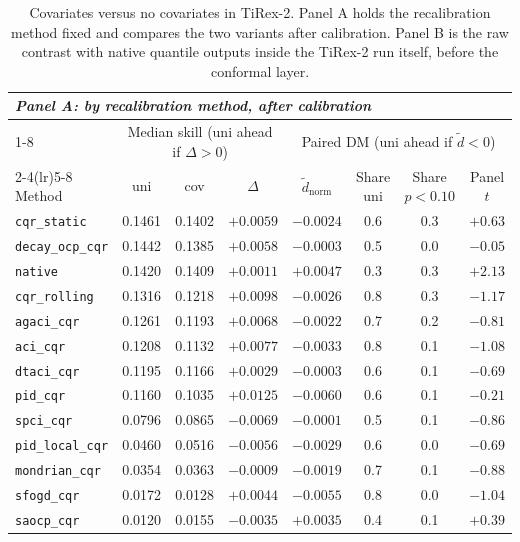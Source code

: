 \begin{table}[t]
\centering
\caption{Covariates versus no covariates in TiRex-2. Panel A holds the
         recalibration method fixed and compares the two variants after
         calibration. Panel B is the raw contrast with native quantile outputs inside the TiRex-2 run itself,
         before the conformal layer.}
\label{tab:res_cov}
\small
\begin{tabular}{lccccccc}
\toprule
\multicolumn{8}{l}{\textit{Panel A: by recalibration method, after calibration}}\\
\cmidrule(lr){1-8}
 & \multicolumn{3}{c}{Median skill (uni ahead if $\Delta>0$)} & \multicolumn{4}{c}{Paired DM (uni ahead if $\tilde d<0$)} \\
\cmidrule(lr){2-4}\cmidrule(lr){5-8}
Method & uni & cov & $\Delta$ & $\tilde d_{\mathrm{norm}}$ & Share uni & Share $p<0.10$ & Panel $t$ \\
\midrule
\texttt{cqr\_static}    & 0.1461 & 0.1402 & $+0.0059$ & $-0.0024$ & 0.6 & 0.3 & $+0.63$ \\
\texttt{decay\_ocp\_cqr}& 0.1442 & 0.1385 & $+0.0058$ & $-0.0003$ & 0.5 & 0.0 & $-0.05$ \\
\texttt{native}         & 0.1420 & 0.1409 & $+0.0011$ & $+0.0047$ & 0.3 & 0.3 & $+2.13$ \\
\texttt{cqr\_rolling}   & 0.1316 & 0.1218 & $+0.0098$ & $-0.0026$ & 0.8 & 0.3 & $-1.17$ \\
\texttt{agaci\_cqr}     & 0.1261 & 0.1193 & $+0.0068$ & $-0.0022$ & 0.7 & 0.2 & $-0.81$ \\
\texttt{aci\_cqr}       & 0.1208 & 0.1132 & $+0.0077$ & $-0.0033$ & 0.8 & 0.1 & $-1.08$ \\
\texttt{dtaci\_cqr}     & 0.1195 & 0.1166 & $+0.0029$ & $-0.0003$ & 0.6 & 0.1 & $-0.69$ \\
\texttt{pid\_cqr}       & 0.1160 & 0.1035 & $+0.0125$ & $-0.0060$ & 0.6 & 0.1 & $-0.21$ \\
\texttt{spci\_cqr}      & 0.0796 & 0.0865 & $-0.0069$ & $-0.0001$ & 0.5 & 0.1 & $-0.86$ \\
\texttt{pid\_local\_cqr}& 0.0460 & 0.0516 & $-0.0056$ & $-0.0029$ & 0.6 & 0.0 & $-0.69$ \\
\texttt{mondrian\_cqr}  & 0.0354 & 0.0363 & $-0.0009$ & $-0.0019$ & 0.7 & 0.1 & $-0.88$ \\
\texttt{sfogd\_cqr}     & 0.0172 & 0.0128 & $+0.0044$ & $-0.0055$ & 0.8 & 0.0 & $-1.04$ \\
\texttt{saocp\_cqr}     & 0.0120 & 0.0155 & $-0.0035$ & $+0.0035$ & 0.4 & 0.1 & $+0.39$ \\

\end{tabular}
\end{table}
